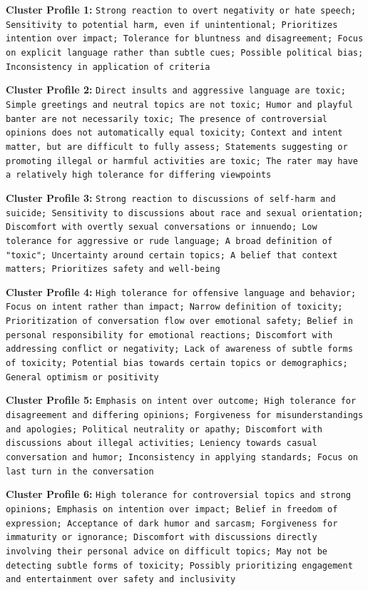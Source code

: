 \documentclass[11pt]{article}
\begin{document}
\textbf{Cluster Profile 1:} \texttt{Strong reaction to overt negativity or hate speech; Sensitivity to potential harm, even if unintentional; Prioritizes intention over impact; Tolerance for bluntness and disagreement; Focus on explicit language rather than subtle cues; Possible political bias; Inconsistency in application of criteria}


\textbf{Cluster Profile 2:} \texttt{Direct insults and aggressive language are toxic; Simple greetings and neutral topics are not toxic; Humor and playful banter are not necessarily toxic; The presence of controversial opinions does not automatically equal toxicity; Context and intent matter, but are difficult to fully assess; Statements suggesting or promoting illegal or harmful activities are toxic; The rater may have a relatively high tolerance for differing viewpoints}


\textbf{Cluster Profile 3:} \texttt{Strong reaction to discussions of self-harm and suicide; Sensitivity to discussions about race and sexual orientation; Discomfort with overtly sexual conversations or innuendo; Low tolerance for aggressive or rude language; A broad definition of "toxic"; Uncertainty around certain topics; A belief that context matters; Prioritizes safety and well-being}


\textbf{Cluster Profile 4:} \texttt{High tolerance for offensive language and behavior; Focus on intent rather than impact; Narrow definition of toxicity; Prioritization of conversation flow over emotional safety; Belief in personal responsibility for emotional reactions; Discomfort with addressing conflict or negativity; Lack of awareness of subtle forms of toxicity; Potential bias towards certain topics or demographics; General optimism or positivity}


\textbf{Cluster Profile 5:} \texttt{Emphasis on intent over outcome; High tolerance for disagreement and differing opinions; Forgiveness for misunderstandings and apologies; Political neutrality or apathy; Discomfort with discussions about illegal activities; Leniency towards casual conversation and humor; Inconsistency in applying standards; Focus on last turn in the conversation}


\textbf{Cluster Profile 6:} \texttt{High tolerance for controversial topics and strong opinions; Emphasis on intention over impact; Belief in freedom of expression; Acceptance of dark humor and sarcasm; Forgiveness for immaturity or ignorance; Discomfort with discussions directly involving their personal advice on difficult topics; May not be detecting subtle forms of toxicity; Possibly prioritizing engagement and entertainment over safety and inclusivity}
\end{document}
